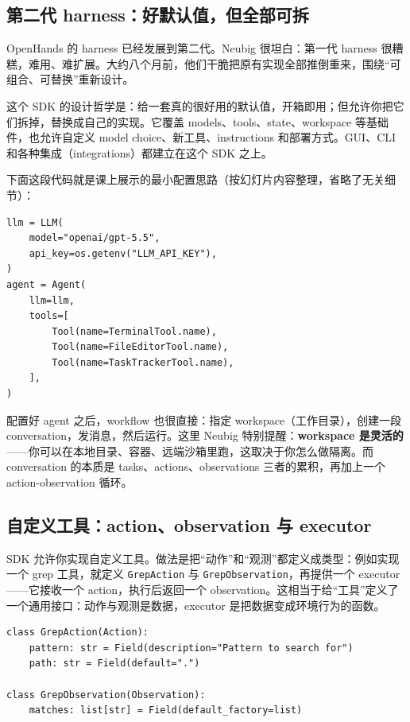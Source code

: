 \documentclass[a4paper]{article}
\begin{document}
\subsection{第二代 harness：好默认值，但全部可拆}

OpenHands 的 harness 已经发展到第二代。Neubig 很坦白：第一代 harness 很糟糕，难用、难扩展。大约八个月前，他们干脆把原有实现全部推倒重来，围绕“可组合、可替换”重新设计。

这个 SDK 的设计哲学是：给一套真的很好用的默认值，开箱即用；但允许你把它们拆掉，替换成自己的实现。它覆盖 models、tools、state、workspace 等基础件，也允许自定义 model choice、新工具、instructions 和部署方式。GUI、CLI 和各种集成（integrations）都建立在这个 SDK 之上。

下面这段代码就是课上展示的最小配置思路（按幻灯片内容整理，省略了无关细节）：

\begin{lstlisting}[caption={用 OpenHands SDK 配置一个基础 agent（按幻灯片内容整理）},label={lst:sdk-config}]
llm = LLM(
    model="openai/gpt-5.5",
    api_key=os.getenv("LLM_API_KEY"),
)
agent = Agent(
    llm=llm,
    tools=[
        Tool(name=TerminalTool.name),
        Tool(name=FileEditorTool.name),
        Tool(name=TaskTrackerTool.name),
    ],
)
\end{lstlisting}

配置好 agent 之后，workflow 也很直接：指定 workspace（工作目录），创建一段 conversation，发消息，然后运行。这里 Neubig 特别提醒：\textbf{workspace 是灵活的}——你可以在本地目录、容器、远端沙箱里跑，这取决于你怎么做隔离。而 conversation 的本质是 tasks、actions、observations 三者的累积，再加上一个 action-observation 循环。

\subsection{自定义工具：action、observation 与 executor}

SDK 允许你实现自定义工具。做法是把“动作”和“观测”都定义成类型：例如实现一个 grep 工具，就定义 \texttt{GrepAction} 与 \texttt{GrepObservation}，再提供一个 executor——它接收一个 action，执行后返回一个 observation。这相当于给“工具”定义了一个通用接口：动作与观测是数据，executor 是把数据变成环境行为的函数。

\begin{lstlisting}[caption={自定义工具：action 与 observation 的类型定义（按幻灯片内容整理）},label={lst:custom-tool}]
class GrepAction(Action):
    pattern: str = Field(description="Pattern to search for")
    path: str = Field(default=".")

class GrepObservation(Observation):
    matches: list[str] = Field(default_factory=list)
\end{lstlisting}
\end{document}
